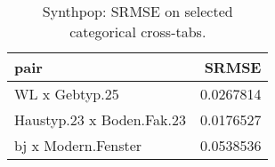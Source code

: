 \begin{table}

\caption{\label{tab:tab:synthpop:srmse}Synthpop: SRMSE on selected categorical cross-tabs.}
\centering
\begin{tabular}[t]{lr}
\toprule
pair & SRMSE\\
\midrule
WL x Gebtyp.25 & 0.0267814\\
Haustyp.23 x Boden.Fak.23 & 0.0176527\\
bj x Modern.Fenster & 0.0538536\\
\bottomrule
\end{tabular}
\end{table}